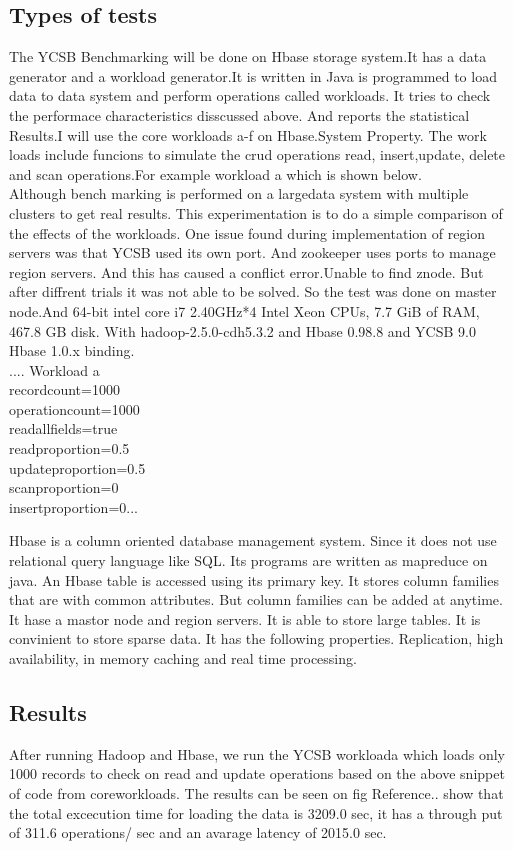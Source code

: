 \documentclass{bigdata}
\begin{document}
\subsection{Types of tests}
The YCSB Benchmarking will be done on Hbase storage system.It has a data generator and a workload generator.It is written in Java is programmed to load data to data system and perform operations called workloads. It tries to check the performace characteristics disscussed above. And reports the statistical Results.I will use the core workloads a-f on Hbase.System Property. The work loads include funcions to simulate the crud operations read, insert,update, delete and scan operations.For example workload a which is shown below.\\
Although bench marking is performed on a largedata system with multiple clusters to get real results. This experimentation is to do a simple comparison of the effects of the workloads. One issue found during implementation of region servers was that YCSB used its own port. And zookeeper uses ports to manage region servers. And this has caused a conflict error.Unable to find znode. But after diffrent trials it was not able to be solved.  So the test was done on master node.And  64-bit intel core i7 2.40GHz*4 Intel Xeon CPUs, 7.7 GiB of RAM, 467.8 GB disk. With hadoop-2.5.0-cdh5.3.2 and Hbase 0.98.8 and YCSB 9.0 Hbase 1.0.x binding.\\
....
Workload a\\
recordcount=1000\\
operationcount=1000\\
readallfields=true\\
readproportion=0.5\\
updateproportion=0.5\\
scanproportion=0\\
insertproportion=0...

Hbase is a column oriented database management system. Since it does not use relational query language like SQL. Its programs are written as mapreduce on java. An Hbase table is accessed using its primary key. It stores column families that are with common attributes. But column families can be added at anytime. It hase a mastor node and region servers. It is able to store large tables. It is convinient to store sparse data. It has the following properties. Replication, high availability, in memory caching and real time processing. 
\subsection{Results}
After running Hadoop and Hbase, we run the YCSB workloada which loads only 1000 records to check on read and update operations based on the above snippet of code from coreworkloads. The results can be seen on fig Reference.. show that the total excecution time for loading the data is 3209.0 sec,  it has a through put of 311.6 operations/ sec and an avarage latency of 2015.0 sec.
\end{document}
